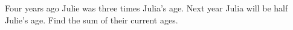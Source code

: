 Four years ago Julie was three times Julia's age. Next year Julia will be half Julie's age. Find the sum of their current ages.
